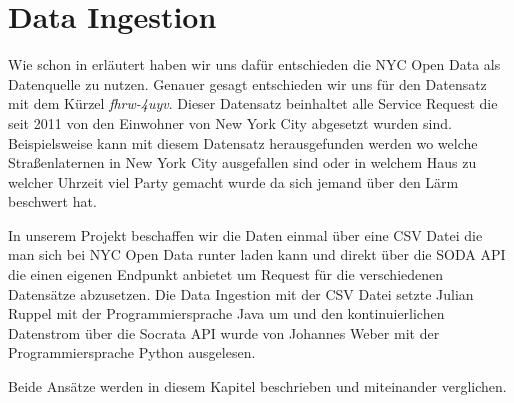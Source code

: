 \section{Data Ingestion}

Wie schon in  erläutert haben wir uns dafür entschieden die NYC Open Data als Datenquelle zu nutzen.
Genauer gesagt entschieden wir uns für den Datensatz mit dem Kürzel \textit{fhrw-4uyv}.
Dieser Datensatz beinhaltet alle Service Request die seit 2011 von den Einwohner von New York City abgesetzt wurden sind.
Beispielsweise kann mit diesem Datensatz herausgefunden werden wo welche Straßenlaternen in New York City ausgefallen sind
oder in welchem Haus zu welcher Uhrzeit viel Party gemacht wurde da sich jemand über den Lärm beschwert hat.

In unserem Projekt beschaffen wir die Daten einmal über eine \ac{CSV} Datei die man sich bei NYC Open Data runter laden kann
und direkt über die \ac{SODA} \ac{API} die einen eigenen Endpunkt anbietet um Request für die verschiedenen Datensätze abzusetzen.
Die Data Ingestion mit der \ac{CSV} Datei setzte Julian Ruppel mit der Programmiersprache Java um und
den kontinuierlichen Datenstrom über die Socrata \ac{API} wurde von Johannes Weber mit der Programmiersprache Python
ausgelesen.

Beide Ansätze werden in diesem Kapitel beschrieben und miteinander verglichen.




